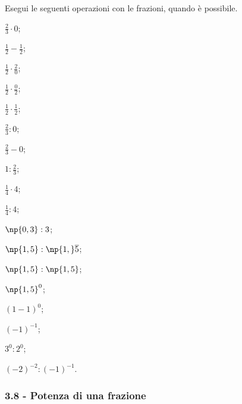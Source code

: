 \begin{esercizio}
 \label{ese:3.61}
Esegui le seguenti operazioni con le frazioni, quando è possibile.
\begin{multicols}{3}
\begin{enumeratea}
\spazielenx
\item $\displaystyle{\frac{2}{3}\cdot0}$;
\item $\displaystyle{\frac{1}{2}-\frac{1}{2}}$;
\item $\displaystyle{\frac{1}{2}\cdot\frac{2}{0}}$;
\item $\displaystyle{\frac{1}{2}}\cdot\frac{0}{2}$;
\item $\displaystyle{\frac{1}{2}\cdot\frac{1}{2}}$;
\item $\displaystyle{\frac{2}{3}:0}$;
\item $\displaystyle{\frac{2}{3}-0}$;
\item $\displaystyle{1:\frac{2}{3}}$;
\item $\displaystyle{\frac{1}{4}\cdot4}$;
\item $\displaystyle{\frac{1}{4}:4}$;
\item $\np{0,3}:3$;
\item $\displaystyle{\np{1,5}:\np{1,}\overline{5}}$;
\item $\np{1,5}:\np{1,5}$;
\item $\np{1,5}^0$;
\item $(1-1)^0$;
\item $(-1)^{-1}$;
\item $3^0:2^0$;
\item $(-2)^{-2}:(-1)^{-1}$.
\end{enumeratea}
\end{multicols}
\end{esercizio}

\subsubsection*{3.8 - Potenza di una frazione}

